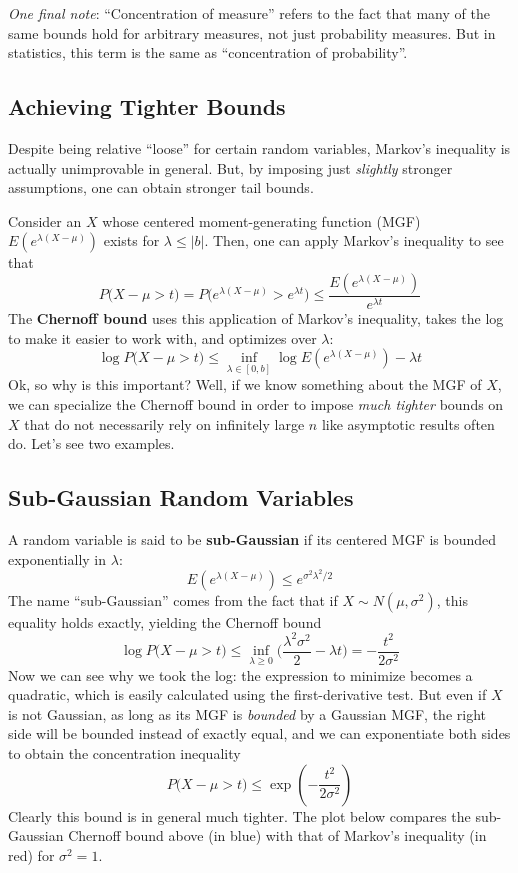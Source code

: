 \documentclass[
]{article}
\begin{document}
\emph{One final note}: ``Concentration of measure'' refers to the fact
that many of the same bounds hold for arbitrary measures, not just
probability measures. But in statistics, this term is the same as
``concentration of probability''.

\hypertarget{achieving-tighter-bounds}{%
\subsection{Achieving Tighter Bounds}\label{achieving-tighter-bounds}}

Despite being relative ``loose'' for certain random variables, Markov's
inequality is actually unimprovable in general. But, by imposing just
\emph{slightly} stronger assumptions, one can obtain stronger tail
bounds.

Consider an \(X\) whose centered moment-generating function (MGF)
\(E(e^{\lambda (X - \mu)})\) exists for \(\lambda \leq |b|\). Then, one
can apply Markov's inequality to see that
\[P\Big(X - \mu > t\Big) = P\Big(e^{\lambda(X - \mu)} > e^{\lambda t}\Big) \leq \frac{E(e^{\lambda(X - \mu)})}{e^{\lambda t}}\]
The \textbf{Chernoff bound} uses this application of Markov's
inequality, takes the log to make it easier to work with, and optimizes
over \(\lambda\):
\[\log P\Big(X - \mu > t\Big) \leq \inf_{\lambda \in [0, b]} \log E(e^{\lambda(X - \mu)}) - \lambda t\]
Ok, so why is this important? Well, if we know something about the MGF
of \(X\), we can specialize the Chernoff bound in order to impose
\emph{much tighter} bounds on \(X\) that do not necessarily rely on
infinitely large \(n\) like asymptotic results often do. Let's see two
examples.

\hypertarget{sub-gaussian-random-variables}{%
\subsection{Sub-Gaussian Random
Variables}\label{sub-gaussian-random-variables}}

A random variable is said to be \textbf{sub-Gaussian} if its centered
MGF is bounded exponentially in \(\lambda\):
\[E(e^{\lambda(X - \mu)}) \leq e^{\sigma^2 \lambda^2 / 2}\] The name
``sub-Gaussian'' comes from the fact that if \(X\sim N(\mu, \sigma^2)\),
this equality holds exactly, yielding the Chernoff bound
\[\log P\Big(X - \mu > t\Big) \leq \inf_{\lambda \geq 0} \Big(\frac{\lambda^2\sigma^2}{2} - \lambda t\Big) = -\frac{t^2}{2\sigma^2}\]
Now we can see why we took the log: the expression to minimize becomes a
quadratic, which is easily calculated using the first-derivative test.
But even if \(X\) is not Gaussian, as long as its MGF is \emph{bounded}
by a Gaussian MGF, the right side will be bounded instead of exactly
equal, and we can exponentiate both sides to obtain the concentration
inequality \[P\Big(X - \mu > t\Big) \leq \exp(-\frac{t^2}{2\sigma^2})\]
Clearly this bound is in general much tighter. The plot below compares
the sub-Gaussian Chernoff bound above (in blue) with that of Markov's
inequality (in red) for \(\sigma^2 = 1\).
\end{document}
